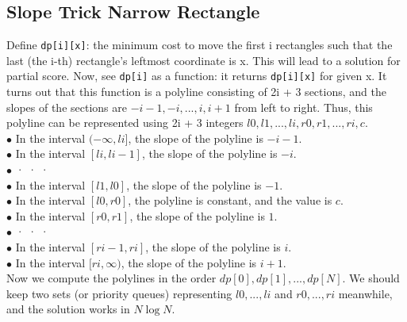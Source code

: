 \subsection{Slope Trick Narrow Rectangle}
Define \texttt{dp[i][x]}: the minimum cost to move the first i rectangles such that the last (the i-th) rectangle’s
leftmost coordinate is x. This will lead to a solution for partial score.
Now, see \texttt{dp[i]} as a function: it returns \texttt{dp[i][x]} for given x. It turns out that this function is a polyline
consisting of 2i + 3 sections, and the slopes of the sections are $ -i - 1, -i, . . . , i, i + 1 $ from left to right.
Thus, this polyline can be represented using 2i + 3 integers $l0, l1, ..., li, r0, r1, ..., ri, c$.\\
$\bullet$ In the interval $(-\infty, li]$, the slope of the polyline is $-i - 1$.\\
$\bullet$ In the interval $[li, li-1]$, the slope of the polyline is $-i$.\\
$\bullet$ · · ·\\
$\bullet$ In the interval $[l1, l0]$, the slope of the polyline is $-1$.\\
$\bullet$ In the interval $[l0, r0]$, the polyline is constant, and the value is $c$.\\
$\bullet$ In the interval $[r0, r1]$, the slope of the polyline is $1$.\\
$\bullet$ · · ·\\
$\bullet$ In the interval $[ri-1, ri]$, the slope of the polyline is $i$.\\
$\bullet$ In the interval $[ri,\infty)$, the slope of the polyline is $i + 1$.\\
Now we compute the polylines in the order $dp[0], dp[1], . . . , dp[N]$. We should keep two sets (or priority
queues) representing ${l0,...,li}$ and ${r0,...,ri}$ meanwhile, and the solution works in $N \log N$. 




